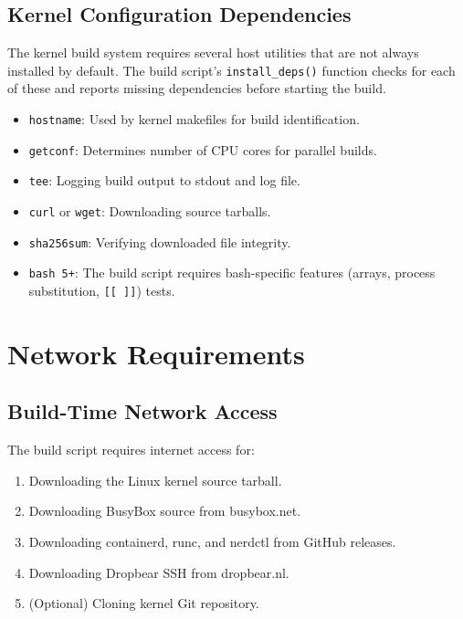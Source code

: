 \subsection{Kernel Configuration Dependencies}

The kernel build system requires several host utilities that are not
always installed by default. The build script's \texttt{install\_deps()}
function checks for each of these and reports missing dependencies before
starting the build.

\begin{itemize}[nosep]
  \item \texttt{hostname}: Used by kernel makefiles for build identification.
  \item \texttt{getconf}: Determines number of CPU cores for parallel builds.
  \item \texttt{tee}: Logging build output to stdout and log file.
  \item \texttt{curl} or \texttt{wget}: Downloading source tarballs.
  \item \texttt{sha256sum}: Verifying downloaded file integrity.
  \item \texttt{bash 5+}: The build script requires bash-specific features
        (arrays, process substitution, \texttt{[[ ]]}) tests.
\end{itemize}

\section{Network Requirements}

\subsection{Build-Time Network Access}

The build script requires internet access for:

\begin{enumerate}[nosep]
  \item Downloading the Linux kernel source tarball.
  \item Downloading BusyBox source from busybox.net.
  \item Downloading containerd, runc, and nerdctl from GitHub releases.
  \item Downloading Dropbear SSH from dropbear.nl.
  \item (Optional) Cloning kernel Git repository.
\end{enumerate}

